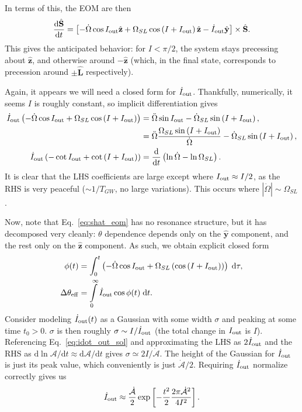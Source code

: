 \documentclass[11pt,
        usenames, %
        dvipsnames %
    ]{article}
\newcommand*{\rd}[2]{\frac{\mathrm{d}#1}{\mathrm{d}#2}}
\newcommand*{\rdil}[2]{\mathrm{d}#1 / \mathrm{d}#2}
\newcommand*{\bm}[1]{\boldsymbol{\mathbf{#1}}}
\newcommand*{\uv}[1]{\hat{\bm{#1}}}
\newcommand*{\abs}[1]{\left|#1\right|}
\newcommand*{\p}[1]{\left(#1\right)}
\newcommand*{\s}[1]{\left[#1\right]}
\begin{document}
In terms of this, the EOM are then
\begin{equation}
    \rd{\uv{S}}{t} = \s{-\dot{\Omega} \cos I_{\rm out}\uv{z} + \Omega_{SL}
        \cos \p{I + I_{\rm out}}\uv{z} - \dot{I}_{\rm out}\uv{y}} \times
        \uv{S}.\label{eq:shat_eom}
\end{equation}
This gives the anticipated behavior: for $I < \pi/2$, the system stays
precessing about $\uv{z}$, and otherwise around $-\uv{z}$ (which, in the final
state, corresponds to precession around $\pm \uv{L}$ respectively).

Again, it appears we will need a closed form for $\dot{I}_{\rm out}$.
Thankfully, numerically, it seems $I$ is roughly constant, so implicit
differentiation gives
\begin{align}
    \dot{I}_{\rm out}\p{-\dot{\Omega}\cos I_{\rm out}
        + \Omega_{SL}\cos\p{I + I_{\rm out}}}
        &= \ddot{\Omega} \sin I_{\rm out} - \dot{\Omega}_{SL}
            \sin\p{I + I_{\rm out}},\\
        &= \ddot{\Omega}\frac{\Omega_{SL}\sin\p{I + I_{\rm out}}}{\dot{\Omega}}
            - \dot{\Omega}_{SL}\sin\p{I + I_{\rm out}},\\
    \dot{I}_{\rm out}\p{-\cot I_{\rm out} + \cot \p{I + I_{\rm out}}}
        &= \rd{}{t}\p{\ln \dot{\Omega} - \ln
        \Omega_{SL}}.\label{eq:idot_out_sol}
\end{align}
It is clear that the LHS coefficients are large except where $I_{\rm out}
\approx I / 2$, as the RHS is very peaceful ($\sim 1/T_{GW}$, no large
variations). This occurs where $\abs{\dot{\Omega}} \sim \Omega_{SL}$.

Now, note that Eq.~\eqref{eq:shat_eom} has no resonance structure, but it has
decomposed very cleanly: $\theta$ dependence depends only on the $\uv{y}$
component, and the rest only on the $\uv{z}$ component. As such, we obtain
explicit closed form
\begin{align}
    \phi(t) &= \int_0^t \p{-\dot{\Omega}\cos I_{\rm out}
            + \Omega_{SL}\p{\cos \p{I + I_{\rm out}}}}\;\mathrm{d}\tau,\\
    \Delta \theta_{\rm eff}
        &= \int\limits_0^\infty \dot{I}_{\rm out}\cos \phi(t)\;\mathrm{d}t.
\end{align}
Consider modeling $\dot{I}_{\rm out}(t)$ as a Gaussian with some width $\sigma$
and peaking at some time $t_0 > 0$. $\sigma$ is then roughly $\sigma \sim
I / \dot{I}_{\rm out}$ (the total change in $I_{\rm out}$ is $I$). Referencing
Eq.~\eqref{eq:idot_out_sol} and approximating the LHS as $2\dot{I}_{\rm out}$
and the RHS as $\rdil{\ln \mathcal{A}}{t} \approx \rdil{\mathcal{A}}{t}$ gives
$\sigma \simeq 2I /\dot{\mathcal{A}}$. The height of the Gaussian for
$\dot{I}_{\rm out}$ is just its peak value, which conveniently is just
$\dot{\mathcal{A}} / 2$. Requiring $\dot{I}_{\rm out}$ normalize correctly gives
us
\begin{equation}
    \dot{I}_{\rm out} \approx \frac{\dot{\mathcal{A}}}{2}\exp\s{
        -\frac{t^2}{2}\frac{2\pi \dot{\mathcal{A}}^2}{4I^2}}.
\end{equation}
\end{document}
